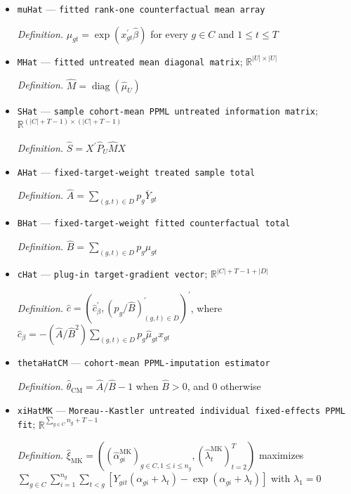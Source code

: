 \documentclass{article}
\begin{document}
\begin{itemize}
  \item \texttt{muHat} --- \texttt{fitted rank-\allowbreak{}one counterfactual mean array}
  \par\smallskip\noindent\emph{Definition.} \(\widehat\mu_{gt}=\exp(x_{gt}^{\prime}\widehat\beta)\) for every \(g\in C\) and \(1\le t\le T\)
  \item \texttt{MHat} --- \texttt{fitted untreated mean diagonal matrix}; \(\mathbb R^{|U|\times|U|}\)
  \par\smallskip\noindent\emph{Definition.} \(\widehat M=\operatorname{diag}(\widehat\mu_U)\)
  \item \texttt{SHat} --- \texttt{sample cohort-\allowbreak{}mean PPML untreated information matrix}; \(\mathbb R^{(|C|+T-1)\times(|C|+T-1)}\)
  \par\smallskip\noindent\emph{Definition.} \(\widehat S=X^{\prime}\widehat P_U\widehat M X\)
  \item \texttt{AHat} --- \texttt{fixed-\allowbreak{}target-\allowbreak{}weight treated sample total}
  \par\smallskip\noindent\emph{Definition.} \(\widehat A=\sum_{(g,t)\in D}p_g\overline Y_{gt}\)
  \item \texttt{BHat} --- \texttt{fixed-\allowbreak{}target-\allowbreak{}weight fitted counterfactual total}
  \par\smallskip\noindent\emph{Definition.} \(\widehat B=\sum_{(g,t)\in D}p_g\widehat\mu_{gt}\)
  \item \texttt{cHat} --- \texttt{plug-\allowbreak{}in target-\allowbreak{}gradient vector}; \(\mathbb R^{|C|+T-1+|D|}\)
  \par\smallskip\noindent\emph{Definition.} \(\widehat c=(\widehat c_{\beta}^{\prime},(p_g/\widehat B)_{(g,t)\in D}^{\prime})^{\prime}\), where \(\widehat c_{\beta}=-(\widehat A/\widehat B^2)\sum_{(g,t)\in D}p_g\widehat\mu_{gt}x_{gt}\)
  \item \texttt{thetaHatCM} --- \texttt{cohort-\allowbreak{}mean PPML-\allowbreak{}imputation estimator}
  \par\smallskip\noindent\emph{Definition.} \(\widehat\theta_{\mathrm{CM}}=\widehat A/\widehat B-1\) when \(\widehat B>0\), and \(0\) otherwise
  \item \texttt{xiHatMK} --- \texttt{Moreau-\allowbreak{}-\allowbreak{}Kastler untreated individual fixed-\allowbreak{}effects PPML fit}; \(\mathbb R^{\sum_{g\in C}n_g+T-1}\)
  \par\smallskip\noindent\emph{Definition.} \(\widehat\xi_{\mathrm{MK}}=((\widehat\alpha^{\mathrm{MK}}_{gi})_{g\in C,1\le i\le n_g},(\widehat\lambda^{\mathrm{MK}}_t)_{t=2}^T)\) maximizes \(\sum_{g\in C}\sum_{i=1}^{n_g}\sum_{t<g}[Y_{git}(\alpha_{gi}+\lambda_t)-\exp(\alpha_{gi}+\lambda_t)]\) with \(\lambda_1=0\)

\end{itemize}
\end{document}
